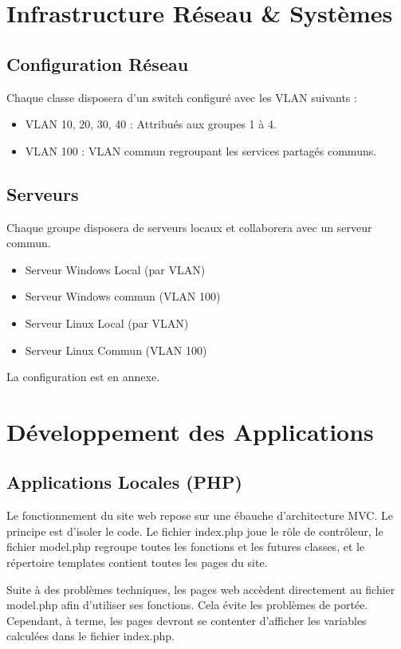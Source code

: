 \documentclass[a4paper,12pt]{report}
\begin{document}
\chapter{Infrastructure Réseau \& Systèmes}
\section{Configuration Réseau}
Chaque classe disposera d'un switch configuré avec les VLAN suivants :
\begin{itemize}
    \item VLAN 10, 20, 30, 40 : Attribués aux groupes 1 à 4.
    \item VLAN 100 : VLAN commun regroupant les services partagés communs.
\end{itemize}

\section{Serveurs}
Chaque groupe disposera de serveurs locaux et collaborera avec un serveur commun.
\begin{itemize}
    \item Serveur Windows Local (par VLAN)
    \item Serveur Windows commun (VLAN 100)
    \item Serveur Linux Local (par VLAN)
    \item Serveur Linux Commun (VLAN 100)
\end{itemize}

La configuration est en annexe.

\chapter{Développement des Applications}
\section{Applications Locales (PHP)}


Le fonctionnement du site web repose sur une ébauche d'architecture MVC.
Le principe est d’isoler le code.
Le fichier index.php joue le rôle de contrôleur, le fichier model.php regroupe toutes les fonctions et les futures classes, et le répertoire templates contient toutes les pages du site.

Suite à des problèmes techniques, les pages web accèdent directement au fichier model.php afin d'utiliser ses fonctions. Cela évite les problèmes de portée. Cependant, à terme, les pages devront se contenter d’afficher les variables calculées dans le fichier index.php.
\end{document}

